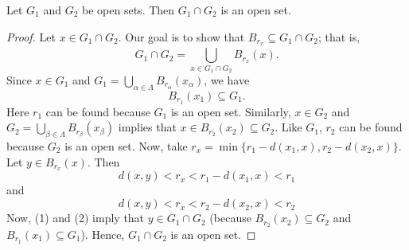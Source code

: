 \begin{prop}
    Let \( {G}_{1} \) and \( {G}_{2} \) be open sets. Then \( {G}_{1} \cap {G}_{2} \) is an open set.
\end{prop}
\begin{proof}
    Let \( x \in {G}_{1} \cap {G}_{2} \). Our goal is to show that \( {B}_{{r}_{x}} \subseteq {G}_{1} \cap {G}_{2} \); that is, 
    \[  {G}_{1} \cap {G}_{2} = \bigcup_{ x \in {G}_{1} \cap {G}_{2} }^{  }  {B}_{{r}_{x}}(x). \]
    Since \( x \in {G}_{1} \) and \( {G}_{1} = \bigcup_{  \alpha \in \Lambda }^{  } {B}_{{r}_{\alpha}} ({x}_{\alpha})  \), we have 
    \[  {B}_{{r}_{1}}({x}_{1}) \subseteq  {G}_{1}. \]
    Here \( {r}_{1}  \) can be found because \( {G}_{1} \) is an open set.
    Similarly, \( x \in {G}_{2} \) and \( {G}_{2} = \bigcup_{ \beta \in \Lambda }^{  }  {B}_{{r}_{\beta}} ({x}_{\beta}) \) implies that \( x \in {B}_{{r}_{2}}({x}_{2}) \subseteq {G}_{2} \). Like \( {G}_{1} \), \( {r}_{2}  \) can be found because \( {G}_{2} \) is an open set. Now, take \( {r}_{x} = \min \{ {r}_{1} - d({x}_{1}, x) , {r}_{2} - d({x}_{2}, x) \}  \). Let \( y \in {B}_{{r}_{x}}(x) \). Then 
    \[ d(x,y) < {r}_{x} < {r}_{1} - d({x}_{1}, x) < {r}_{1} \tag{1}\]
    and
    \[  d(x,y) < {r}_{x} < {r}_{2} - d({x}_{2}, x) < {r}_{2} \tag{2} \]
    Now, (1) and (2) imply that \( y \in {G}_{1} \cap {G}_{2} \) (because \( {B}_{{r}_{2}}({x}_{2}) \subseteq  {G}_{2} \) and \( {B}_{{r}_{1}}({x}_{1}) \subseteq  {G}_{1}  \)). Hence, \( {G}_{1} \cap {G}_{2}  \) is an open set.
\end{proof}





